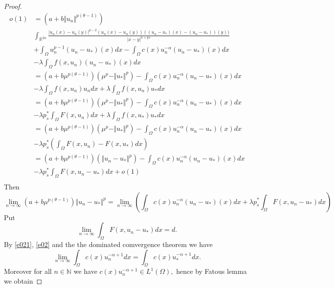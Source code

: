 \documentclass[10pt,twoside,reqno,centertags,draft]{amsart}
\begin{document}
\begin{proof}
\begin{equation*}
\begin{aligned}
o(1) &=(a +b\Vert u_n \Vert^{p(\theta -1)})\\
&\int_{\mathbb{R}^{2n}} \frac{\vert u_n(x) - u_n(y) \vert^{p-2}(u_n(x) - u_n(y))((u_n -u_*)(x) - (u_n -u_*))(y))}{\vert x-y \vert^{n + ps}}\\
& +\int_{\Omega}  u_n^{p-1}(u_n -u_*)(x) dx -\int_{\Omega} c(x)u_n^{-\alpha} (u_n -u_*)(x)dx\\
& -\lambda \int_{\Omega} f(x,u_n) (u_n -u_*)(x)dx\\
& =(a +b\mu^{p(\theta -1)})(\mu^{p} -\Vert u_*\Vert^{p}) -\int_{\Omega} c(x)u_n^{-\alpha} (u_n -u_*)(x)dx\\
&-\lambda \int_{\Omega} f(x,u_n)u_n dx +\lambda \int_{\Omega} f(x,u_n)u_*dx\\
& =(a +b\mu^{p(\theta -1)})(\mu^{p} -\Vert u_*\Vert^{p}) -\int_{\Omega} c(x)u_n^{-\alpha} (u_n -u_*)(x)dx\\
& -\lambda p_s^*\int_{\Omega} F(x,u_n) dx +\lambda \int_{\Omega} f(x,u_*)u_*dx\\
& =(a +b\mu^{p(\theta -1)})(\mu^{p} -\Vert u_*\Vert^{p}) -\int_{\Omega} c(x)u_n^{-\alpha} (u_n -u_*)(x)dx \\
&-\lambda p_s^*\left(\int_{\Omega} F(x,u_n) -F(x,u_*)dx\right)\\
& =(a +b\mu^{p(\theta -1)})(\Vert u_n -u_*\Vert^{p}) -\int_{\Omega} c(x)u_n^{-\alpha} (u_n -u_*)(x)dx \\
&-\lambda p_s^* \int_{\Omega} F(x,u_n -u_*)dx +o(1)\\
\end{aligned}
\end{equation*}
Then 
{\footnotesize
\begin{equation}\label{e030}
\lim_{n \to \infty}(a +b\mu^{p(\theta -1)})\Vert u_n -u_*\Vert^{p} =\lim_{n \to \infty}\left( \int_{\Omega} c(x)u_n^{-\alpha} (u_n -u_*)(x)dx +\lambda p_s^* \int_{\Omega} F(x,u_n -u_*)dx\right)
\end{equation}
}
Put 
\begin{equation}
\lim_{n \to \infty} \int_{\Omega} F(x,u_n -u_*)dx =d.
\end{equation}
By \ref{e021}, \ref{e02} and the the dominated comvergence theorem we have
\begin{equation}
\lim_{n \to \infty}\int_{\Omega} c(x)u_n^{-\alpha +1}dx =\int_{\Omega} c(x)u_*^{-\alpha +1}dx.
\end{equation}
Moreover for all $ n \in \mathbb{N}$ we have $ c(x)u_n^{-\alpha +1} \in L^{1}(\Omega),$ hence by Fatous lemma we obtain

\end{proof}
\end{document}
